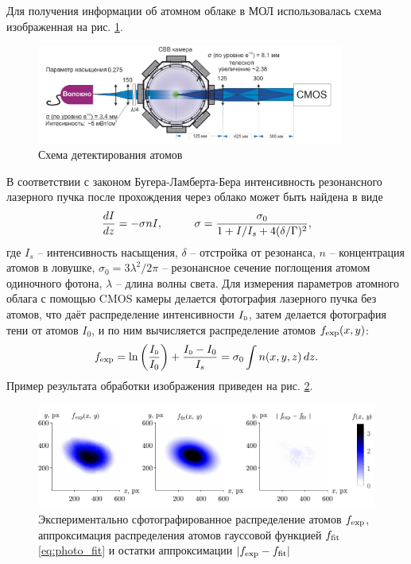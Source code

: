 Для получения информации об атомном облаке в МОЛ использовалась схема изображенная на рис. \ref{fig:exp_photo}. 

\begin{figure}[ht]
    \centering
    \includegraphics[width=0.9\textwidth]{figs/detect.png}
    \caption{Схема детектирования атомов \cite{vlad}}
    \label{fig:exp_photo}
\end{figure}


В соответствии с законом Бугера-Ламберта-Бера интенсивность резонансного лазерного пучка после прохождения через облако может быть найдена в виде
\begin{equation}
    \frac{d I}{d z} = - \sigma n I,
    \hspace{10 mm} 
    \sigma = \frac{\sigma_0}{1+I/I_s + 4 (\delta/\Gamma)^2},
    \label{eq:deltaG}
\end{equation}
где $I_s$ -- интенсивность насыщения, $\delta$ -- отстройка от резонанса, $n$ -- концентрация атомов в ловушке, $\sigma_0 = 3 \lambda^2 / 2\pi$ -- резонансное сечение поглощения атомом одиночного фотона, $\lambda$ -- длина волны света. Для измерения параметров атомного облага с помощью CMOS камеры делается фотография лазерного пучка без атомов, что даёт распределение интенсивности $\subt{I}{D}$, затем делается фотография тени от атомов $I_0$, и по ним вычисляется распределение атомов $f_{\textnormal{exp}}(x, y)$:
\begin{equation}
    \sub{f}{exp} = \ln\left(\frac{\subt{I}{D}}{I_0}\right) + \frac{\subt{I}{D} - I_0}{I_s} = \sigma_0 \int n(x, y, z) \d z.
\end{equation}
Пример результата обработки изображения приведен на рис. \ref{fig:fitmot}.

\begin{figure}[ht]
    \centering
    \includegraphics{figs/fit_mot_v2.pdf}
    \caption{Экспериментально сфотографированное распределение атомов $f_{\textnormal{exp}}$, аппроксимация распределения атомов гауссовой функцией $f_{\textnormal{fit}}$ \eqref{eq:photo_fit} и остатки аппроксимации $|f_{\textnormal{exp}} - f_{\textnormal{fit}}|$}
    \label{fig:fitmot}
\end{figure}

